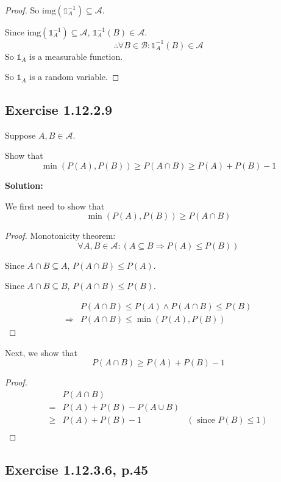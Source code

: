 \documentclass{article}
\begin{document}
\begin{proof}
So \(\mathrm{img}(\mathds{1}_A^{-1}) \subseteq \mathcal{A}\).

Since \(\mathrm{img}(\mathds{1}_A^{-1})\subseteq \mathcal{A}\), \(\mathds{1}_A^{-1}(B)\in \mathcal{A}\).
\[\therefore \forall B\in \mathcal{B}: \mathds{1}_A^{-1}(B)\in \mathcal{A}\]
So \(\mathds{1}_A\) is a measurable function.

So \(\mathds{1}_A\) is a random variable.
\end{proof}

\subsection{Exercise 1.12.2.9}

Suppose \(A,B \in \mathcal{A}\).

Show that
\[\min(P(A),P(B)) \geq P(A\cap B) \geq P(A)+P(B)-1\]

\textbf{Solution:}

We first need to show that
\[\min(P(A), P(B)) \geq P(A \cap B)\]

\begin{proof}
Monotonicity theorem:
\[\forall A,B\in \mathcal{A}: (A\subseteq B \Rightarrow P(A)\leq P(B))\]

Since \(A\cap B \subseteq A\), \(P(A\cap B) \leq P(A)\).

Since \(A\cap B \subseteq B\), \(P(A\cap B) \leq P(B)\).

\begin{align*}
	 & P(A\cap B)\leq P(A) \wedge P(A\cap B)\leq P(B) \\
	\Rightarrow & P(A \cap B) \leq \min(P(A), P(B))
\end{align*}
\end{proof}

Next, we show that
\[P(A \cap B) \geq P(A)+P(B)-1\]

\begin{proof}
\begin{align*}
	 & P(A \cap B) \\
	=& P(A)+P(B)-P(A \cup B) \\
	\geq& P(A)+P(B)-1 & (\text{ since } P(B)\leq 1) \\
\end{align*}
\end{proof}

\subsection{Exercise 1.12.3.6, p.45}
\end{document}
